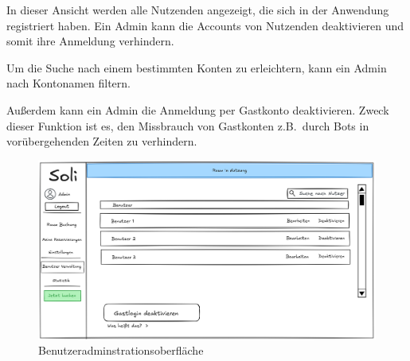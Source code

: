 In dieser Ansicht werden alle Nutzenden angezeigt, die sich in der Anwendung registriert haben.
Ein Admin kann die Accounts von Nutzenden deaktivieren und somit ihre Anmeldung verhindern.

Um die Suche nach einem bestimmten Konten zu erleichtern, kann ein Admin nach Kontonamen filtern.

Außerdem kann ein Admin die Anmeldung per Gastkonto deaktivieren.
Zweck dieser Funktion ist es, den Missbrauch von Gastkonten z.B.\ durch Bots in vorübergehenden Zeiten zu verhindern.

\begin{figure}[ht]
    \centering
    \includegraphics[width=\textwidth]{figures/ui/useradminui}
    \caption{Benutzeradminstrationsoberfläche}
    \label{fig:adminuser}
\end{figure}

